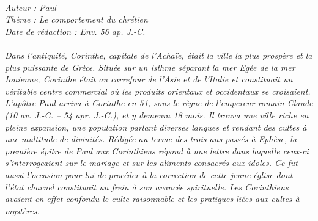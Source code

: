 \BFont
\noindent\hrulefill
{\footnotesize
\textit{
\bigskip
{\centering{}
\\Auteur : Paul
\\Thème : Le comportement du chrétien
\\Date de rédaction : Env. 56 ap. J.-C.\\}
}
\textit{
\\Dans l'antiquité, Corinthe, capitale de l'Achaïe, était la ville la plus prospère et la plus puissante de Grèce. Située sur un isthme séparant la mer Egée de la mer Ionienne, Corinthe était au carrefour de l'Asie et de l'Italie et constituait un véritable centre commercial où les produits orientaux et occidentaux se croisaient.
\\L'apôtre Paul arriva à Corinthe en 51, sous le règne de l'empereur romain Claude (10 av. J.-C. – 54 apr. J.-C.), et y demeura 18 mois. Il trouva une ville riche en pleine expansion, une population parlant diverses langues et rendant des cultes à une multitude de divinités. Rédigée au terme des trois ans passés à Ephèse, la première épître de Paul aux Corinthiens répond à une lettre dans laquelle ceux-ci s'interrogeaient sur le mariage et sur les aliments consacrés aux idoles. Ce fut aussi l'occasion pour lui de procéder à la correction de cette jeune église dont l'état charnel constituait un frein à son avancée spirituelle. Les Corinthiens avaient en effet confondu le culte raisonnable et les pratiques liées aux cultes à mystères.\bigskip
}
}
\par\nobreak\noindent\hrulefill

